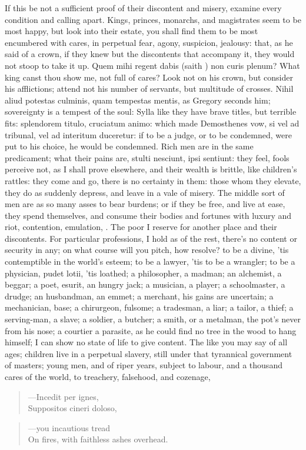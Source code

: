 {If this be not a sufficient proof of their discontent and misery,
examine every condition and calling apart. Kings, princes, monarchs,
and magistrates seem to be most happy, but look into their estate, you
shall find them to be most encumbered with cares, in perpetual
fear, agony, suspicion, jealousy: that, as he said of a crown, if
they knew but the discontents that accompany it, they would not stoop
to take it up. Quem mihi regent dabis (saith \Chrysostom{}) non curis
plenum? What king canst thou show me, not full of cares? Look not
on his crown, but consider his afflictions; attend not his number of
servants, but multitude of crosses. Nihil aliud potestas culminis, quam
tempestas mentis, as Gregory seconds him; sovereignty is a tempest of
the soul: Sylla like they have brave titles, but terrible fits:
splendorem titulo, cruciatum animo: which made Demosthenes vow,
si vel ad tribunal, vel ad interitum duceretur: if to be a judge, or to
be condemned, were put to his choice, he would be condemned. Rich men
are in the same predicament; what their pains are, stulti nesciunt,
ipsi sentiunt: they feel, fools perceive not, as I shall prove
elsewhere, and their wealth is brittle, like children's rattles: they
come and go, there is no certainty in them: those whom they elevate,
they do as suddenly depress, and leave in a vale of misery. The middle
sort of men are as so many asses to bear burdens; or if they be free,
and live at ease, they spend themselves, and consume their bodies and
fortunes with luxury and riot, contention, emulation, \etc{}. The poor I
reserve for another place and their discontents.
For particular professions, I hold as of the rest, there's no content
or security in any; on what course will you pitch, how resolve? to be a
divine, 'tis contemptible in the world's esteem; to be a lawyer, 'tis
to be a wrangler; to be a physician, pudet lotii, 'tis loathed; a
philosopher, a madman; an alchemist, a beggar; a poet, esurit, an
hungry jack; a musician, a player; a schoolmaster, a drudge; an
husbandman, an emmet; a merchant, his gains are uncertain; a
mechanician, base; a chirurgeon, fulsome; a tradesman, a liar; a
tailor, a thief; a serving-man, a slave; a soldier, a butcher; a smith,
or a metalman, the pot's never from his nose; a courtier a parasite, as
he could find no tree in the wood to hang himself; I can show no state
of life to give content. The like you may say of all ages; children
live in a perpetual slavery, still under that tyrannical government of
masters; young men, and of riper years, subject to labour, and a
thousand cares of the world, to treachery, falsehood, and cozenage,
%
\begin{verse}
---\textlatin{Incedit per ignes},\\
\textlatin{Suppositos cineri doloso},
\end{verse}
\translationrule
\begin{verse}
---you incautious tread\\
On fires, with faithless ashes overhead.
\end{verse}

}
